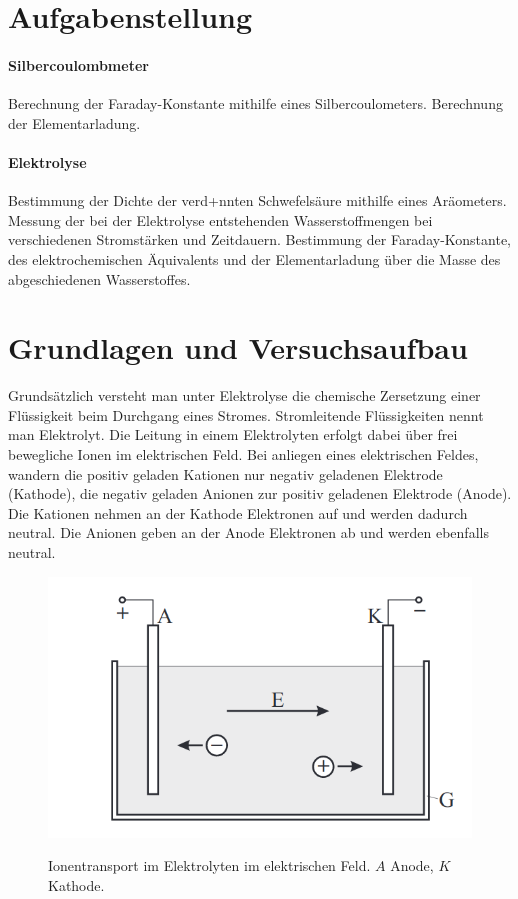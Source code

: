 \documentclass{article}
\begin{document}
\parindent0cm




\pagestyle{fancy}

\section{Aufgabenstellung}

\paragraph{Silbercoulombmeter}
Berechnung der Faraday-Konstante mithilfe eines Silbercoulometers. Berechnung der Elementarladung.

\paragraph{Elektrolyse}
Bestimmung der Dichte der verd+nnten Schwefelsäure mithilfe eines Aräometers. Messung der bei der Elektrolyse entstehenden Wasserstoffmengen bei verschiedenen Stromstärken und Zeitdauern. Bestimmung der Faraday-Konstante, des elektrochemischen Äquivalents und der Elementarladung über die Masse des abgeschiedenen Wasserstoffes.





\section{Grundlagen und Versuchsaufbau}

Grundsätzlich versteht man unter Elektrolyse die chemische Zersetzung einer Flüssigkeit beim Durchgang eines Stromes. Stromleitende Flüssigkeiten nennt man Elektrolyt. Die Leitung in einem Elektrolyten erfolgt dabei über frei bewegliche Ionen im elektrischen Feld. Bei anliegen eines elektrischen Feldes, wandern die positiv geladen Kationen nur negativ geladenen Elektrode (Kathode), die negativ geladen Anionen zur positiv geladenen Elektrode (Anode). Die Kationen nehmen an der Kathode Elektronen auf und werden dadurch neutral. Die Anionen geben an der Anode Elektronen ab und werden ebenfalls neutral.



\begin{figure}[H]
\caption{Ionentransport im Elektrolyten im elektrischen Feld. $A$ Anode, $K$ Kathode.}
\label{fig:pic1}
{\centering
\includegraphics[scale=1.8]{pic1.png}}
\end{figure}
\end{document}
